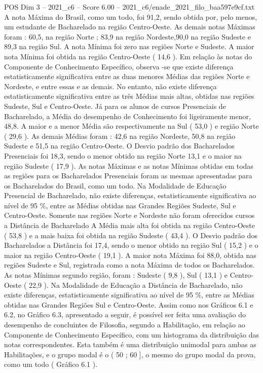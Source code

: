 \begin{textsample}{POS Dim 3 – 2021\_c6 – Score 6.00 – 2021\_c6/enade\_2021\_filo\_baa597e9cf.txt}
A nota Máxima do Brasil, como um todo, foi 91,2, sendo obtida por, pelo menos, um estudante de Bacharelado na região Centro-Oeste.
As demais notas Máximas foram : 60,5, na região Norte ; 83,9 na região Nordeste,90,0 na região Sudeste e 89,3 na região Sul.
A nota Mínima foi zero nas regiões Norte e Sudeste.
A maior nota Mínima foi obtida na região Centro-Oeste ( 14,6 ).
Em relação às notas do Componente de Conhecimento Específico, observa -se que existe diferença estatisticamente significativa entre as duas menores Médias das regiões Norte e Nordeste, e entre essas e as demais.
No entanto, não existe diferença estatisticamente significativa entre as três Médias mais altas, obtidas nas regiões Sudeste, Sul e Centro-Oeste.
Já para os alunos de cursos Presenciais de Bacharelado, a Média do desempenho de Conhecimento foi ligeiramente menor, 48,8.
A maior e a menor Média são respectivamente na Sul ( 53,0 ) e região Norte ( 29,6 ).
As demais Médias foram : 42,6 na região Nordeste, 50,8 na região Sudeste e 51,5 na região Centro-Oeste.
O Desvio padrão dos Bacharelados Presenciais foi 18,3, sendo o menor obtido na região Norte 13,1 e o maior na região Sudeste ( 17,9 ).
As notas Máximas e as notas Mínimas obtidas em todas as regiões para os Bacharelados Presenciais foram as mesmas apresentadas para os Bacharelados do Brasil, como um todo.
Na Modalidade de Educação Presencial de Bacharelado, não existe diferenças, estatisticamente significativa ao nível de 95 \%, entre as Médias obtidas nas Grandes Regiões Sudeste, Sul e Centro-Oeste.
Somente nas regiões Norte e Nordeste não foram oferecidos cursos a Distância de Bacharelado A Média mais alta foi obtida na região Centro-Oeste ( 53,8 ) e a mais baixa foi obtida na região Sudeste ( 43,4 ).
O Desvio padrão dos Bacharelados a Distância foi 17,4, sendo o menor obtido na região Sul ( 15,2 ) e o maior na região Centro-Oeste ( 19,1 ).
A maior nota Máxima foi 88,0, obtida nas regiões Sudeste e Sul, registrada como a nota Máxima de todos os Bacharelados.
As notas Mínimas segundo região, foram : Sudeste ( 9,8 ), Sul ( 13,1 ) e Centro-Oeste ( 22,9 ).
Na Modalidade de Educação a Distância de Bacharelado, não existe diferenças, estatisticamente significativa ao nível de 95 \%, entre as Médias obtidas nas Grandes Regiões Sul e Centro-Oeste.
Assim como nos Gráficos 6.1 e 6.2, no Gráfico 6.3, apresentado a seguir, é possível ser feita uma avaliação do desempenho de concluintes de Filosofia, segundo a Habilitação, em relação ao Componente de Conhecimento Específico, com um histograma da distribuição das notas correspondentes.
Esta também é uma distribuição unimodal para ambas as Habilitações, e o grupo modal é o ( 50 ; 60 ], o mesmo do grupo modal da prova, como um todo ( Gráfico 6.1 ).

\end{textsample}

